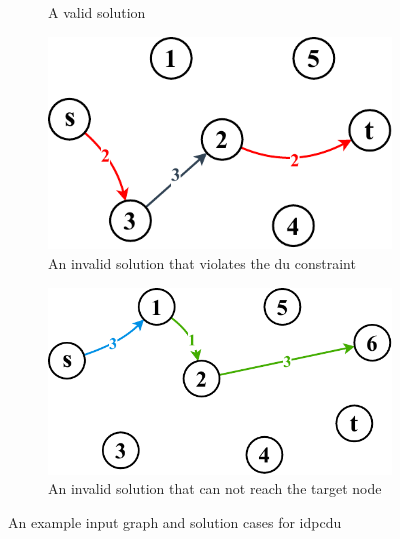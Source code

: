 \begin{figure}[htbp]
\begin{subfigure}{.49\linewidth}
		\caption{A valid solution}
		\label{fig:valid_path_a}
	\end{subfigure}
	\begin{subfigure}{.49\linewidth}
		\centering
		\includegraphics[scale=\scalefigure]{Figures/chap 2/Invalid Solution.pdf}
		\caption{An invalid solution that violates the \gls{du} constraint}
		\label{fig:invalid_path_b}
	\end{subfigure}
	\begin{subfigure}{.49\linewidth}
		\centering
		\includegraphics[scale=\scalefigure]{Figures/chap 2/Invalid Solution 2.pdf}
		\caption{An invalid solution that can not reach
			the target node}
		\label{fig:invalid_path_c}
	\end{subfigure}	
	\caption{An example input graph and solution cases for \gls{idpcdu}}
	\label{fig:solution_cases}
\end{figure}